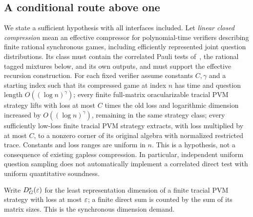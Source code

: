 \subsection{A conditional route above one}\label{sec:conditional}
We state a sufficient hypothesis with all interfaces included. Let \emph{linear closed compression} mean an effective compressor for polynomial-time verifiers describing finite rational synchronous games, including efficiently represented joint question distributions. Its class must contain the correlated Pauli tests of~\cite{Salle}, the rational tagged mixtures below, and its own outputs, and must support the effective recursion construction. For each fixed verifier assume constants $C,\gamma$ and a starting index such that its compressed game at index $n$ has time and question length $O((\log n)^\gamma)$; every finite full-matrix oracularizable tracial PVM strategy lifts with loss at most $C$ times the old loss and logarithmic dimension increased by $O((\log n)^\gamma)$, remaining in the same strategy class; every sufficiently low-loss finite tracial PVM strategy extracts, with loss multiplied by at most $C$, to a nonzero corner of its original algebra with normalized restricted trace. Constants and loss ranges are uniform in $n$. This is a hypothesis, not a consequence of existing gapless compression. In particular, independent uniform question sampling does not automatically implement a correlated direct test with uniform quantitative soundness.

Write $D_G^s(\varepsilon)$ for the least representation dimension of a finite tracial PVM strategy with loss at most $\varepsilon$; a finite direct sum is counted by the sum of its matrix sizes. This is the synchronous dimension demand.

